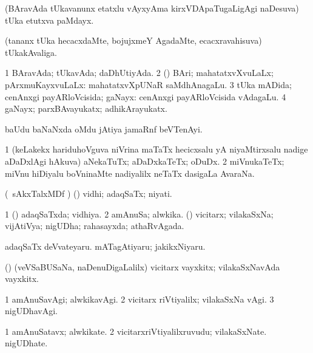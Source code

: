 \bentry
{} 
\gl{\nA}
\expl{}
\bmng
(BAravAda tUkavanunx etatxlu vAyxyAma kirxVDApaTugaLigAgi naDesuva) tUka etutxva paMdayx. 
\emng
\eentry

\bentry
{} 
\gl{\nA}
\expl{}
\bmng
(tananx tUka hecacxdaMte, bojujxmeY AgadaMte, ecacxravahisuva) tUkakAvaliga. 
\emng
\eentry

\bentry
{} 
\gl{\gu}
\bmng
\bnum
\num{1} BAravAda; tUkavAda; daDhUtiyAda. 
\num{2} (\rUpa) BAri; mahatatxvXvuLaLx; pArxmuKayxvuLaLx:  mahatatxvXpUNaR saMdhAnagaLu. 
\num{3} tUka mADida; cenAnxgi payARloVcisida; gaNayx:  cenAnxgi payARloVcisida vAdagaLu. 
\num{4} gaNayx; parxBAvayukatx; adhikArayukatx. 
\enum
\emng
\eentry

\bentry
{} 
\gl{\nA}
\expl{}
\bmng
baUdu baNaNxda oMdu jAtiya jamaRnf beVTenAyi. 
\emng
\eentry

\bentry
{} 
\gl{\nA}
\expl{}
\bmng
\bnum
\num{1} (keLakekx hariduhoVguva niVrina maTaTx hecicxsalu yA niyaMtirxsalu nadige aDaDxlAgi hAkuva) aNekaTuTx; aDaDxkaTeTx; oDuDx. 
\num{2} miVnukaTeTx; miVnu hiDiyalu boVninaMte nadiyalilx neTaTx dasigaLa AvaraNa. 
\enum
\emng
\eentry

\bentry
{} 
\gl{\nA}
\expl{}
\bmng
(\kanmu\ sAkxTalxMDf \parx) (\pArxparx) vidhi; adaqSaTx; niyati. 
\emng
\eentry

\bentry
{} 
\gl{\gu}
\expl{}
\bmng
\bnum
\num{1} (\pArxparx) adaqSaTxda; vidhiya. 
\num{2} amAnuSa; alwkika. (\AmA) vicitarx; vilakaSxNa; vijAtiVya; nigUDha; rahasayxda; athaRvAgada. 
\enum
\emng

\noindent 
\gl{\pagu}
\expl{}
\bmng
\banum
{} adaqSaTx deVvateyaru. 
 mATagAtiyaru; jakikxNiyaru. 
\eanum
\emng
\eentry

\bentry
{} 
\gl{\nA}
\expl{}
\bmng
(\AmA) (veVSaBUSaNa, naDenuDigaLalilx) vicitarx vayxkitx; vilakaSxNavAda vayxkitx. 
\emng
\eentry

\bentry
{} 
\gl{\kirxvi}
\expl{}
\bmng
\bnum
\num{1} amAnuSavAgi; alwkikavAgi. 
\num{2} vicitarx riVtiyalilx; vilakaSxNa vAgi. 
\num{3} nigUDhavAgi. 
\enum
\emng
\eentry

\bentry
{} 
\gl{\nA}
\expl{}
\bmng
\bnum
\num{1} amAnuSatavx; alwkikate. 
\num{2} vicitarxriVtiyalilxruvudu; vilakaSxNate. nigUDhate. 
\enum
\emng
\eentry

